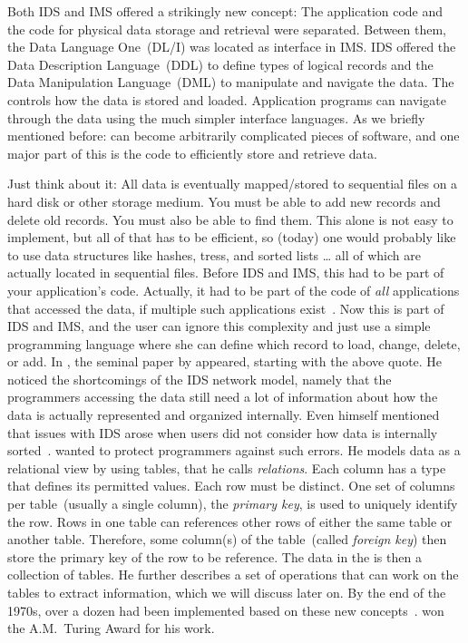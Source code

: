Both IDS and IMS offered a strikingly new concept:
The application code and the code for physical data storage and retrieval were separated.
Between them, the Data Language One~(DL/I) was located as interface in IMS.
IDS offered the Data Description Language~(DDL) to define types of logical records and the Data Manipulation Language~(DML) to manipulate and navigate the data.
The  controls how the data is stored and loaded.
Application programs can navigate through the data using the much simpler interface languages.
As we briefly mentioned before:  can become arbitrarily complicated pieces of software, and one major part of this is the code to efficiently store and retrieve data.

Just think about it:
All data is eventually mapped/stored to sequential files on a hard disk or other storage medium.
You must be able to add new records and delete old records.
You must also be able to find them.
This alone is not easy to implement, but all of that has to be efficient, so (today) one would probably like to use data structures like hashes, tress, and sorted lists {\dots} all of which are actually located in sequential files.
Before IDS and IMS, this had to be part of your application's code.
Actually, it had to be part of the code of \emph{all} applications that accessed the data, if multiple such applications exist~\cite{BBP2007TBOI}.
Now this is part of IDS and IMS, and the user can ignore this complexity and just use a simple programming language where she can define which record to load, change, delete, or add.%
%
%
%
In \citeyear{C1970ARMODFLSDB}, the seminal paper \emph{} by \citeauthor{C1970ARMODFLSDB} appeared, starting with the above quote.
He noticed the shortcomings of the IDS network model, namely that the programmers accessing the data still need a lot of information about how the data is actually represented and organized internally.
Even \citeauthor{B2009TOOTIDSITFDAD} himself mentioned that issues with IDS arose when users did not consider how data is internally sorted~\cite{B2009TOOTIDSITFDAD}.
 wanted to protect programmers against such errors.
He models data as a relational view by using tables, that he calls \emph{relations}.
Each column has a type that defines its permitted values.
Each row must be distinct.
One set of columns per table~(usually a single column), the \emph{primary key}, is used to uniquely identify the row.
Rows in one table can references other rows of either the same table or another table.
Therefore, some column(s) of the table~(called \emph{foreign key}) then store the primary key of the row to be reference.
The data in the  is then a collection of tables.
He further describes a set of operations that can work on the tables to extract information, which we will discuss later on.
By the end of the 1970s, over a dozen  had been implemented based on these new concepts~\cite{K1979RDS}.
 won the A.M.~Turing Award for his work.

